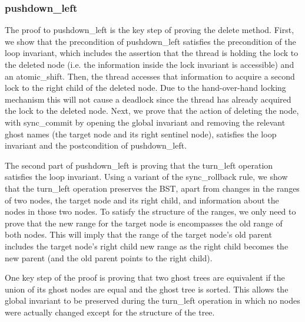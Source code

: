 \documentclass[acmsmall,screen]{acmart}\settopmatter{printfolios=true}
\begin{document}
\subsubsection{pushdown\_left}

The proof to pushdown\_left is the key step of proving the delete method. 
First, we show that the precondition of pushdown\_left satisfies the precondition
of the loop invariant, which includes the assertion that the thread is holding the 
lock to the deleted node (i.e. the information inside the lock invariant is accessible)
and an atomic\_shift. Then, the thread accesses that information to acquire a second 
lock to the right child of the deleted node. Due to the hand-over-hand locking 
mechanism this will not cause a deadlock since the thread has already acquired the 
lock to the deleted node. Next, we prove that the action of deleting the node,
with sync\_commit by opening the global invariant and removing the relevant 
ghost names (the target node and its right sentinel node), satisfies the loop
invariant and the postcondition of pushdown\_left.

The second part of pushdown\_left is proving that the turn\_left operation satisfies
the loop invariant. Using a variant of the sync\_rollback rule, we show that the 
turn\_left operation preserves the BST, apart from changes in the ranges of two nodes,
the target node and its right child, and information about the nodes in those two nodes.
To satisfy the structure of the ranges, we only need to prove that the new range for
the target node is encompasses the old range of both nodes. This will imply that
the range of the target node's old parent includes the target node's right child 
new range as the right child becomes the new parent (and the old parent points to 
the right child).

One key step of the proof is proving that two ghost trees are equivalent if the union
of its ghost nodes are equal and the ghost tree is sorted. This allows the global invariant
to be preserved during the turn\_left operation in which no nodes were actually changed
except for the structure of the tree.
\end{document}
